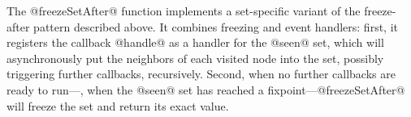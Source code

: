 \singlespacing

\doublespacing


The @freezeSetAfter@ function implements a set-specific variant of the
freeze-after pattern described above.  It combines freezing and
event handlers: first, it registers the callback @handle@ as a handler
for the @seen@ set, which will asynchronously put the neighbors of
each visited node into the set, possibly triggering further callbacks,
recursively.  Second, when no further callbacks are ready to
run---\ie, when the @seen@ set has reached a
fixpoint---@freezeSetAfter@ will freeze the set and return its exact
value.
